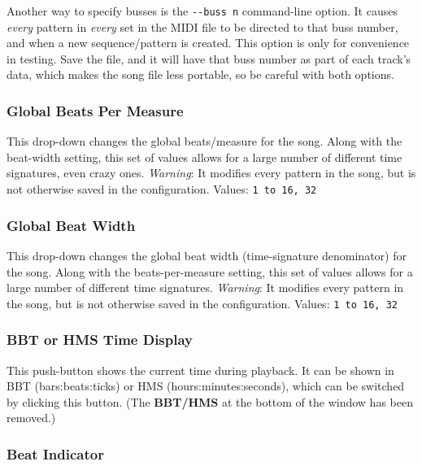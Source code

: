    Another way to specify busses is the
   \texttt{-{}-buss n} command-line option.
   It causes \textsl{every} pattern in \textsl{every} set in the MIDI
   file to be directed to that buss number, and when a new
   sequence/pattern is created.  This option is only
   for convenience in testing.  Save the file, and it will
   have that buss number as part of each track's data, which makes the song
   file less portable, so be careful with both options.

\subsubsection{Global Beats Per Measure}
\label{subsubsec:introduction_global_beats_per_measure}

   This drop-down changes the global beats/measure for the song.
   Along with the beat-width setting, this set of values allows
   for a large number of different time signatures, even crazy ones.
   \textsl{Warning}: It modifies every pattern in the song, but is not
   otherwise saved in the configuration.
   Values: \texttt{1 to 16, 32}

\subsubsection{Global Beat Width}
\label{subsubsec:introduction_global_beat_width}

   This drop-down changes the global beat width (time-signature denominator)
   for the song.
   Along with the beats-per-measure setting, this set of values allows
   for a large number of different time signatures.
   \textsl{Warning}: It modifies every pattern in the song, but is not
   otherwise saved in the configuration.
   Values: \texttt{1 to 16, 32}

\subsubsection{BBT or HMS Time Display}
\label{subsubsec:introduction_time_display}

   This push-button shows the current time during playback. 
   It can be shown in BBT (bars:beats:ticks) or HMS (hours:minutes:seconds),
   which can be switched by clicking this button.
   (The \textbf{BBT/HMS} at the bottom of the window has been removed.)

\subsubsection{Beat Indicator}
\label{subsubsec:introduction_beat_indicator}

